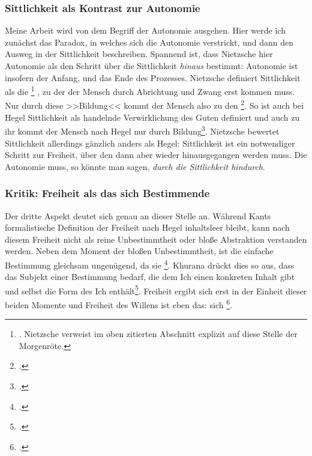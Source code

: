 \documentclass[12pt, a4paper, openany]{report}
\begin{document}
\subsubsection{Sittlichkeit als Kontrast zur Autonomie}
Meine Arbeit wird von dem Begriff der Autonomie ausgehen. 
Hier werde ich zunächst das Paradox, in welches sich die Autonomie verstrickt, und dann den Ausweg in der Sittlichkeit beschreiben.
Spannend ist, dass Nietzsche hier Autonomie als den Schritt über die Sittlichkeit \emph{hinaus} bestimmt:
Autonomie ist insofern der Anfang, und das Ende des Prozesses.
Nietzsche definiert Sittlichkeit als die %
\footnote{
    \cite[][22]{nietzsche_morgenrote_1999}. 
    Nietzsche verweist im oben zitierten Abschnitt explizit auf diese Stelle der Morgenröte.
}%
, zu der der Mensch durch Abrichtung und Zwang erst kommen muss.
Nur durch diese >>Bildung<< kommt der Mensch also zu den \footcite[][297]{nietzsche_jenseits_2014}. 
So ist auch bei Hegel Sittlichkeit als handelnde Verwirklichung des Guten definiert und auch zu ihr kommt der Mensch nach Hegel nur durch Bildung\footcite[Vergleiche dazu etwa:][§ 187 A, S. 191]{hegel_grundlinien_2017}.
Nietzsche bewertet Sittlichkeit allerdings gänzlich anders als Hegel:
Sittlichkeit ist ein notwendiger Schritt zur Freiheit, über den dann aber wieder hinausgegangen werden muss.
Die Autonomie muss, so könnte man sagen, \emph{durch die Sittlichkeit hindurch}.\\

\subsubsection{Kritik: Freiheit als das sich Bestimmende}
Der dritte Aspekt deutet sich genau an dieser Stelle an. 
Während Kants formalistische Definition der Freiheit nach Hegel inhaltsleer bleibt, kann nach diesem Freiheit nicht als reine Unbestimmtheit oder bloße Abstraktion verstanden werden.
Neben dem Moment der bloßen Unbestimmtheit, ist die einfache Bestimmung gleichsam ungenügend, da sie \footcite[][§ 6 A, S. 39]{hegel_grundlinien_2017}.
Khurana drückt dies so aus, dass das Subjekt einer Bestimmung bedarf, die dem Ich einen konkreten Inhalt gibt und selbst die Form des Ich enthält\footcite[Vgl.][285]{khurana_freiheit_2017}. 
Freiheit ergibt sich erst in der Einheit dieser beiden Momente und Freiheit des Willens ist eben das: sich \footcite[][§ 7, S. 40]{hegel_grundlinien_2017}.\\
\end{document}
